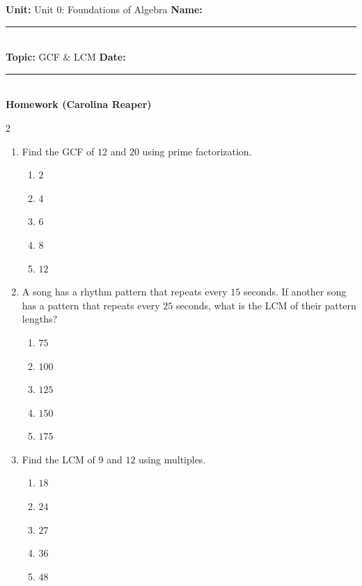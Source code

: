 \documentclass[10pt]{article}
\begin{document}
\enlargethispage{2.5cm}

\begin{tcolorbox}[colback=mainblue!5, colframe=mainblue, sharp corners, boxrule=0.5pt]
    \small \textbf{Unit:} Unit 0: Foundations of Algebra \hfill \textbf{Name:} \rule{3cm}{0.4pt} \\
    \small \textbf{Topic:} GCF & LCM \hfill \textbf{Date:} \rule{2cm}{0.4pt} \\
    \centering \textbf{\large Homework (Carolina Reaper)}
\end{tcolorbox}

\vspace{0.2cm}

\begin{multicols}{2}
\begin{enumerate}[label=\textbf{Q\arabic*.}, leftmargin=*, itemsep=6pt, parsep=0pt]

  \item \small Find the GCF of $12$ and $20$ using prime factorization.
  \begin{enumerate}[label=(\Alph*), leftmargin=0.6cm, nosep, itemsep=2pt]
    \item $2$
    \item $4$
    \item $6$
    \item $8$
    \item $12$
  \end{enumerate}

  \item \small A song has a rhythm pattern that repeats every $15$ seconds. If another song has a pattern that repeats every $25$ seconds, what is the LCM of their pattern lengths?
  \begin{enumerate}[label=(\Alph*), leftmargin=0.6cm, nosep, itemsep=2pt]
    \item $75$
    \item $100$
    \item $125$
    \item $150$
    \item $175$
  \end{enumerate}

  \item \small Find the LCM of $9$ and $12$ using multiples.
  \begin{enumerate}[label=(\Alph*), leftmargin=0.6cm, nosep, itemsep=2pt]
    \item $18$
    \item $24$
    \item $27$
    \item $36$
    \item $48$
  \end{enumerate}


\end{enumerate}
\end{multicols}
\end{document}
